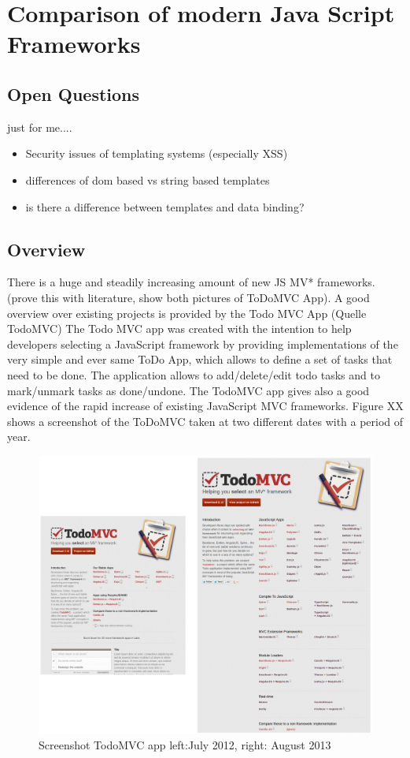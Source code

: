 \chapter{Comparison of modern Java Script Frameworks}

\section{Open Questions}

just for me....
\begin{itemize}
	\item Security issues of templating systems (especially XSS)
	\item differences of dom based vs string based templates
	\item is there a difference between templates and data binding?
\end{itemize}
 
\section{Overview}

There is a huge and steadily increasing amount of new JS MV* frameworks. (prove this with literature, show both pictures of ToDoMVC App). A good overview over existing projects is provided by the Todo MVC App (Quelle TodoMVC)
The Todo MVC app was created with the intention to help developers selecting a JavaScript framework by providing implementations of the very simple and ever same 
ToDo App, which allows to define a set of tasks that need to be done. The application allows to add/delete/edit todo tasks and to mark/unmark tasks as done/undone. The TodoMVC app gives also a good evidence of the rapid increase of existing JavaScript MVC frameworks. Figure XX shows a screenshot of the ToDoMVC taken at two different dates with a period of year.

\begin{figure}
	\centering	\includegraphics[width=1.0\textwidth]{./img/todo_mvc_app_comparison.png}
	\caption{Screenshot TodoMVC app left:July 2012, right: August 2013~}
	\label{fig:todoMvcComp}
\end{figure}
    

